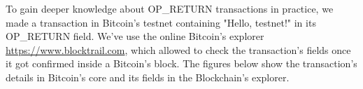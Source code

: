To gain deeper knowledge about OP\_RETURN transactions in practice, we made a transaction in Bitcoin's testnet containing "Hello, testnet!" in its OP\_RETURN field. We've use the online Bitcoin's explorer \url{https://www.blocktrail.com}, which allowed to check the transaction's fields once it got confirmed inside a Bitcoin's block. The figures below show the transaction's details in Bitcoin's core and its fields in the Blockchain's explorer.
\\
\\
\\
\\
\\
\\
